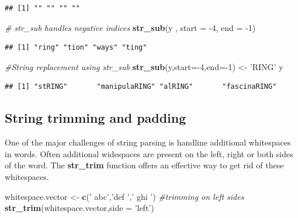 \documentclass[]{book}
\newenvironment{Shaded}{\begin{snugshade}}{\end{snugshade}}
\newcommand{\KeywordTok}[1]{\textcolor[rgb]{0.13,0.29,0.53}{\textbf{{#1}}}}
\newcommand{\DataTypeTok}[1]{\textcolor[rgb]{0.13,0.29,0.53}{{#1}}}
\newcommand{\DecValTok}[1]{\textcolor[rgb]{0.00,0.00,0.81}{{#1}}}
\newcommand{\StringTok}[1]{\textcolor[rgb]{0.31,0.60,0.02}{{#1}}}
\newcommand{\CommentTok}[1]{\textcolor[rgb]{0.56,0.35,0.01}{\textit{{#1}}}}
\newcommand{\NormalTok}[1]{{#1}}
\begin{document}
\begin{verbatim}
## [1] "" "" "" ""
\end{verbatim}

\begin{Shaded}
\begin{Highlighting}[]
\CommentTok{# str_sub handles negative indices}
\KeywordTok{str_sub}\NormalTok{(y , }\DataTypeTok{start =} \NormalTok{-}\DecValTok{4}\NormalTok{, }\DataTypeTok{end =} \NormalTok{-}\DecValTok{1}\NormalTok{)}
\end{Highlighting}
\end{Shaded}

\begin{verbatim}
## [1] "ring" "tion" "ways" "ting"
\end{verbatim}

\begin{Shaded}
\begin{Highlighting}[]
\CommentTok{#String replacement using str_sub}
\KeywordTok{str_sub}\NormalTok{(y,}\DataTypeTok{start=}\NormalTok{-}\DecValTok{4}\NormalTok{,}\DataTypeTok{end=}\NormalTok{-}\DecValTok{1}\NormalTok{) <-}\StringTok{ 'RING'}
\NormalTok{y}
\end{Highlighting}
\end{Shaded}

\begin{verbatim}
## [1] "stRING"       "manipulaRING" "alRING"       "fascinaRING"
\end{verbatim}

\subsection{String trimming and
padding}\label{string-trimming-and-padding}

One of the major challenges of string parsing is handline additional
whitespaces in words. Often additional widespaces are present on the
left, right or both sides of the word. The \textbf{str\_trim} function
offers an effective way to get rid of these whitespaces.

\begin{Shaded}
\begin{Highlighting}[]
\NormalTok{whitespace.vector <-}\StringTok{ }\KeywordTok{c}\NormalTok{(}\StringTok{'  abc'}\NormalTok{,}\StringTok{'def   '}\NormalTok{,}\StringTok{'     ghi       '}\NormalTok{)}
\CommentTok{#trimming on left sides}
\KeywordTok{str_trim}\NormalTok{(whitespace.vector,}\DataTypeTok{side =} \StringTok{'left'}\NormalTok{)}
\end{Highlighting}
\end{Shaded}
\end{document}
